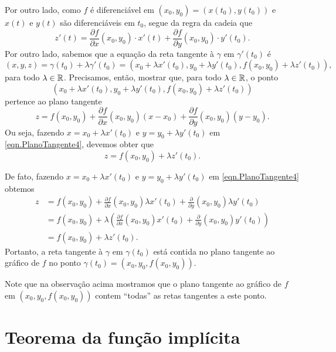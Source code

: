 \begin{remark}
    Por outro lado, como \(f\) é diferenciável em \((x_0,y_0) = (x(t_0),y(t_0))\) e \(x(t)\) e \(y(t)\) são diferenciáveis em \(t_0\), segue da regra da cadeia que
        \begin{equation}\label{eqn.RegraDaCadeia2}
            z'(t) = \frac{\partial f}{\partial x}(x_0,y_0)\cdot x'(t) + \frac{\partial f}{\partial y}(x_0,y_0)\cdot y'(t_0).
        \end{equation}
    Por outro lado, sabemos que a equação da reta tangente à \(\gamma\) em \(\gamma'(t_0)\) é \[(x,y,z) = \gamma(t_0) + \lambda \gamma'(t_0) = (x_0 + \lambda x'(t_0), y_0 + \lambda y'(t_0), f(x_0,y_0) + \lambda z'(t_0)),\] para todo \(\lambda\in\mathbb{R}\). Precisamos, então, mostrar que, para todo \(\lambda\in\mathbb{R}\), o ponto \[(x_0 + \lambda x'(t_0), y_0 + \lambda y'(t_0), f(x_0,y_0) + \lambda z'(t_0))\] pertence ao plano tangente
        \begin{equation}\label{eqn.PlanoTangente4}
            z = f(x_0,y_0) + \frac{\partial f}{\partial x}(x_0,y_0)(x-x_0) + \frac{\partial f}{\partial y}(x_0,y_0)(y - y_0).
        \end{equation}
    Ou seja, fazendo \(x = x_0 + \lambda x'(t_0)\) e \(y = y_0 + \lambda y'(t_0)\) em \eqref{eqn.PlanoTangente4}, devemos obter que \[z = f(x_0,y_0) + \lambda z'(t_0).\]

    De fato, fazendo \(x = x_0 + \lambda x'(t_0)\) e \(y = y_0 + \lambda y'(t_0)\) em \eqref{eqn.PlanoTangente4} obtemos
        \begin{align*}
            z
                & = f(x_0,y_0) + \frac{\partial f}{\partial x}(x_0,y_0) \lambda x'(t_0) + \frac{\partial}{\partial y}(x_0,y_0) \lambda y'(t_0) \\
                & = f(x_0,y_0) + \lambda\left( \frac{\partial f}{\partial x}(x_0,y_0) x'(t_0) + \frac{\partial}{\partial y}(x_0,y_0)  y'(t_0) \right) \\
                & = f(x_0,y_0) + \lambda z'(t_0).
        \end{align*}
    Portanto, a reta tangente à \(\gamma\) em \(\gamma(t_0)\) está contida no plano tangente ao gráfico de \(f\) no ponto \(\gamma(t_0) = (x_0,y_0,f(x_0,y_0))\).
\end{remark}

Note que na observação acima mostramos que o plano tangente ao gráfico de \(f\) em \((x_0,y_0,f(x_0,y_0))\) contem ``todas'' as retas tangentes a este ponto.

\section{Teorema da função implícita}

